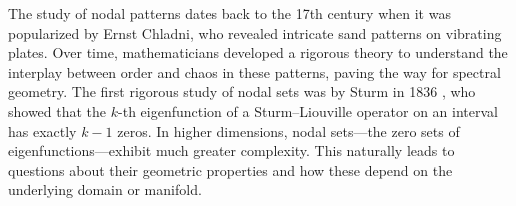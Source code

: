 \documentclass[reqno]{amsart}
\numberwithin{equation}{section}
\newcommand\R{\mathbb{R}}
\newcommand\N{\mathbb{N}}
\begin{document}
The study of nodal patterns dates back to the 17th century when it was popularized by Ernst Chladni, who revealed intricate sand patterns on vibrating plates. Over time, mathematicians developed a rigorous theory to understand the interplay between order and chaos in these patterns, paving the way for spectral geometry. The first rigorous study of nodal sets was by Sturm in 1836 \cite{Sturm1836}, who showed that the $k$-th eigenfunction of a Sturm–Liouville operator on an interval has exactly $k-1$ zeros. In higher dimensions, nodal sets—the zero sets of eigenfunctions—exhibit much greater complexity. This naturally leads to questions about their geometric properties and how these depend on the underlying domain or manifold. 

\end{document}
